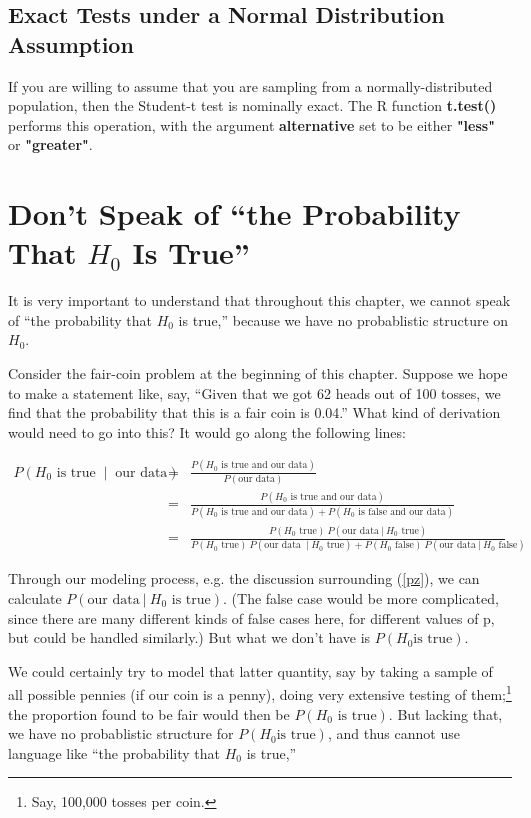 \subsection{Exact Tests under a Normal Distribution Assumption}

If you are willing to assume that you are sampling from a
normally-distributed population, then the Student-t test is nominally
exact.  The R function {\bf t.test()} performs this operation, with the
argument {\bf alternative} set to be either {\bf "less"} or {\bf
"greater"}.

\section{Don't Speak of ``the Probability That $H_0$ Is True''}

It is very important to understand that throughout this chapter, we
cannot speak of ``the probability that $H_0$ is true,'' because we have
no probablistic structure on $H_0$.

Consider the fair-coin problem at the beginning of this chapter.
Suppose we hope to make a statement like, say, ``Given that we got 62
heads out of 100 tosses, we find that the probability that this is a
fair coin is 0.04.''  What kind of derivation would need to go into
this?  It would go along the following lines:

\begin{eqnarray}
P(H_0 \textrm{ is true } ~|~ \textrm{ our data}) &=& 
\frac
{P(H_0 \textrm{ is true and our data})} 
{P(\textrm{our data})} \\ 
&=& 
\nonumber
\frac
{P(H_0 \textrm{ is true and our data})} 
{P(H_0 \textrm{ is true and our data}) + P(H_0 \textrm{ is false and our data})}
\\
&=& 
\nonumber
\frac
{P(H_0 \textrm{ true}) ~ P(\textrm{our data} ~|~ H_0 \textrm{ true})} 
{P(H_0 \textrm{ true}) ~ P(\textrm{our data }  ~|~ H_0 \textrm{ true} ) +
P(H_0 \textrm{ false}) ~ P(\textrm{our data}  ~|~ H_0 \textrm{ false} )} 
\end{eqnarray}

Through our modeling process, e.g. the discussion surrounding
(\ref{pz}), we can calculate $P(\textrm{our data} ~|~ H_0 \textrm{ is
true})$.  (The false case would be more complicated, since there are
many different kinds of false cases here, for different values of p, but
could be handled similarly.) But what we don't have is $P(H_0 \textrm{
is true})$.

We could certainly try to model that latter quantity, say by taking a
sample of all possible pennies (if our coin is a penny), doing very
extensive testing of them;\footnote{Say, 100,000 tosses per coin.} the
proportion found to be fair would then be $P(H_0 \textrm{ is true})$.
But lacking that, we have no probablistic structure for $P(H_0 \textrm{
is true})$, and thus cannot use language like ``the probability that
$H_0$ is true,'' 

